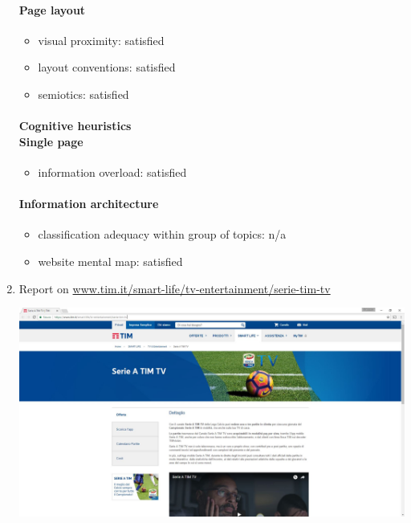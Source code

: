 \begin{enumerate}
	\paragraph*{Page layout}
	\begin{itemize}
		\item visual proximity: satisfied
		\item layout conventions: satisfied
		\item semiotics: satisfied
	\end{itemize}	
	
	\paragraph*{Cognitive heuristics \\ Single page}
	\begin{itemize}
		\item information overload: satisfied
	\end{itemize}	
	
	\paragraph*{Information architecture}
	\begin{itemize}
		\item classification adequacy within group of topics: n/a
		\item website mental map: satisfied
	\end{itemize}

\newpage


\item Report on \url{www.tim.it/smart-life/tv-entertainment/serie-tim-tv}

\begin{center}
	\includegraphics[width=\textwidth]{Screenshot/serieatimtv.jpg}
\end{center}
\vspace{1cm}


\end{enumerate}
